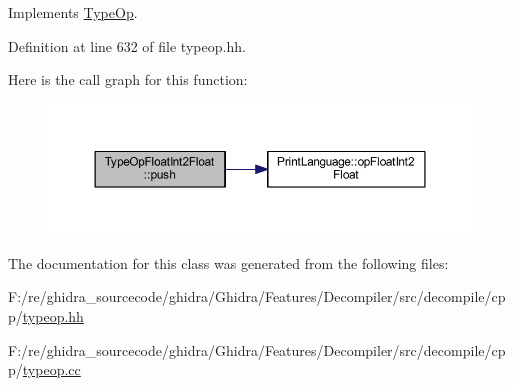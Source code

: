 Implements \mbox{\hyperlink{class_type_op_ac9c9544203ed74dabe6ac662b653b2af}{Type\+Op}}.



Definition at line 632 of file typeop.\+hh.

Here is the call graph for this function\+:
\nopagebreak
\begin{figure}[H]
\begin{center}
\leavevmode
\includegraphics[width=350pt]{class_type_op_float_int2_float_a24a3d658921d5cd83e2f4233c38bb14f_cgraph}
\end{center}
\end{figure}


The documentation for this class was generated from the following files\+:\begin{DoxyCompactItemize}
\item 
F\+:/re/ghidra\+\_\+sourcecode/ghidra/\+Ghidra/\+Features/\+Decompiler/src/decompile/cpp/\mbox{\hyperlink{typeop_8hh}{typeop.\+hh}}\item 
F\+:/re/ghidra\+\_\+sourcecode/ghidra/\+Ghidra/\+Features/\+Decompiler/src/decompile/cpp/\mbox{\hyperlink{typeop_8cc}{typeop.\+cc}}\end{DoxyCompactItemize}
